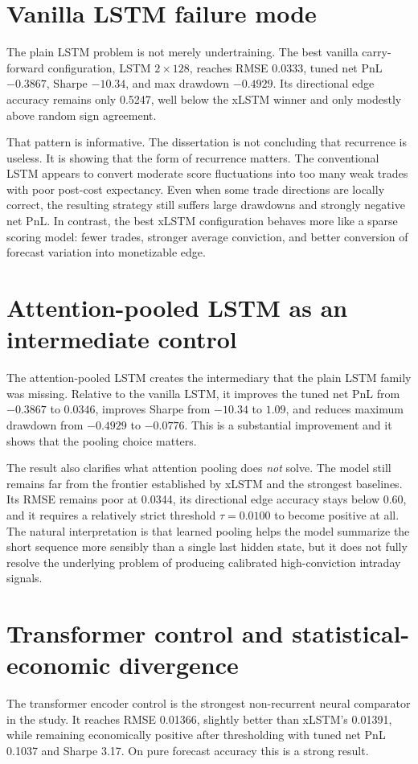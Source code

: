 \documentclass[12pt]{report}
\begin{document}
\section{Vanilla LSTM failure mode}
The plain LSTM problem is not merely undertraining. The best vanilla carry-forward configuration, LSTM \(2\times128\), reaches RMSE 0.0333, tuned net PnL \(-0.3867\), Sharpe \(-10.34\), and max drawdown \(-0.4929\). Its directional edge accuracy remains only 0.5247, well below the xLSTM winner and only modestly above random sign agreement.

That pattern is informative. The dissertation is not concluding that recurrence is useless. It is showing that the form of recurrence matters. The conventional LSTM appears to convert moderate score fluctuations into too many weak trades with poor post-cost expectancy. Even when some trade directions are locally correct, the resulting strategy still suffers large drawdowns and strongly negative net PnL. In contrast, the best xLSTM configuration behaves more like a sparse scoring model: fewer trades, stronger average conviction, and better conversion of forecast variation into monetizable edge.

\section{Attention-pooled LSTM as an intermediate control}
The attention-pooled LSTM creates the intermediary that the plain LSTM family was missing. Relative to the vanilla LSTM, it improves the tuned net PnL from \(-0.3867\) to \(0.0346\), improves Sharpe from \(-10.34\) to \(1.09\), and reduces maximum drawdown from \(-0.4929\) to \(-0.0776\). This is a substantial improvement and it shows that the pooling choice matters.

The result also clarifies what attention pooling does \emph{not} solve. The model still remains far from the frontier established by xLSTM and the strongest baselines. Its RMSE remains poor at 0.0344, its directional edge accuracy stays below 0.60, and it requires a relatively strict threshold \(\tau=0.0100\) to become positive at all. The natural interpretation is that learned pooling helps the model summarize the short sequence more sensibly than a single last hidden state, but it does not fully resolve the underlying problem of producing calibrated high-conviction intraday signals.

\section{Transformer control and statistical-economic divergence}
The transformer encoder control is the strongest non-recurrent neural comparator in the study. It reaches RMSE 0.01366, slightly better than xLSTM's 0.01391, while remaining economically positive after thresholding with tuned net PnL 0.1037 and Sharpe 3.17. On pure forecast accuracy this is a strong result.
\end{document}
